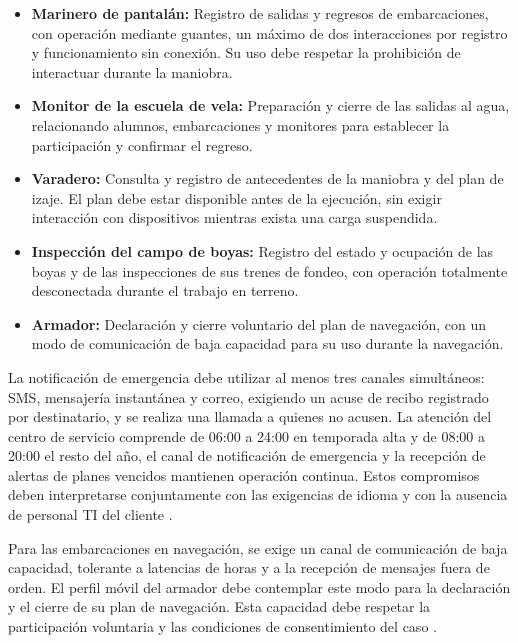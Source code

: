 \begin{itemize}
    \item \textbf{Marinero de pantalán:} Registro de salidas y regresos de embarcaciones, con operación mediante guantes, un máximo de dos interacciones por registro y funcionamiento sin conexión. Su uso debe respetar la prohibición de interactuar durante la maniobra.

    \item \textbf{Monitor de la escuela de vela:} Preparación y cierre de las salidas al agua, relacionando alumnos, embarcaciones y monitores para establecer la participación y confirmar el regreso.

    \item \textbf{Varadero:} Consulta y registro de antecedentes de la maniobra y del plan de izaje. El plan debe estar disponible antes de la ejecución, sin exigir interacción con dispositivos mientras exista una carga suspendida.

    \item \textbf{Inspección del campo de boyas:} Registro del estado y ocupación de las boyas y de las inspecciones de sus trenes de fondeo, con operación totalmente desconectada durante el trabajo en terreno.

    \item \textbf{Armador:} Declaración y cierre voluntario del plan de navegación, con un modo de comunicación de baja capacidad para su uso durante la navegación.
\end{itemize}

La notificación de emergencia debe utilizar al menos tres canales simultáneos: SMS, mensajería instantánea y correo, exigiendo un acuse de recibo registrado por destinatario, y se realiza una llamada a quienes no acusen. La atención del centro de servicio comprende de 06:00 a 24:00 en temporada alta y de 08:00 a 20:00 el resto del año, el canal de notificación de emergencia y la recepción de alertas de planes vencidos mantienen operación continua. Estos compromisos deben interpretarse conjuntamente con las exigencias de idioma y con la ausencia de personal TI del cliente \parencite[cap.~2, secc.~2.4, pp.~7-8; cap.~15, RT-13.12 y RT-16.21, p.~35; RT-21.06, p.~36]{pucv-caso07-2026}.

Para las embarcaciones en navegación, se exige un canal de comunicación de baja capacidad, tolerante a latencias de horas y a la recepción de mensajes fuera de orden. El perfil móvil del armador debe contemplar este modo para la declaración y el cierre de su plan de navegación. Esta capacidad debe respetar la participación voluntaria y las condiciones de consentimiento del caso \parencite[cap.~15, RT-16.21 y RT-17.01, pp.~35-36]{pucv-caso07-2026}.

